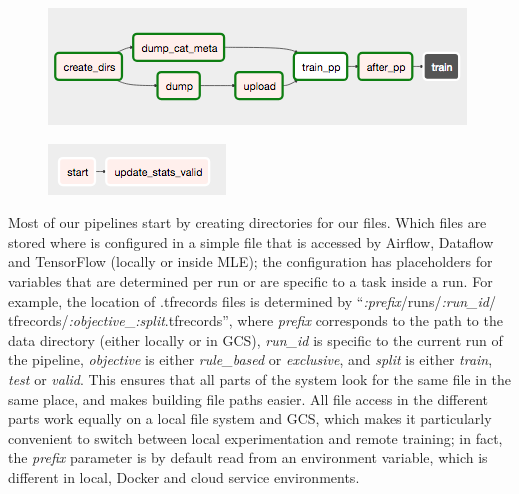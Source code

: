 \begin{figure}
\centering
\begin{minipage}{.48\textwidth}
  \centering
  \includegraphics[width=1.0\linewidth]{figures/af_train_specific}
  \label{fig:af1}
\end{minipage}%
\begin{minipage}{.48\textwidth}
  \centering
  \includegraphics[width=.6\linewidth]{figures/af_train}
  \label{fig:af2}
\end{minipage}
\end{figure}

Most of our pipelines start by creating directories for our files.
Which files are stored where is configured in a simple file that is accessed by Airflow, Dataflow and TensorFlow (locally or inside MLE); the configuration has placeholders for variables that are determined per run or are specific to a task inside a run.
For example, the location of .tfrecords files is determined by ``\textit{:prefix}/runs/\textit{:run\_id}/ tfrecords/\textit{:objective}\_\textit{:split}.tfrecords'', where \textit{prefix} corresponds to the path to the data directory (either locally or in GCS), \textit{run\_id} is specific to the current run of the pipeline, \textit{objective} is either \textit{rule\_based} or \textit{exclusive}, and \textit{split} is either \textit{train}, \textit{test} or \textit{valid}.
This ensures that all parts of the system look for the same file in the same place, and makes building file paths easier.
All file access in the different parts work equally on a local file system and GCS, which makes it particularly convenient to switch between local experimentation and remote training; in fact, the \textit{prefix} parameter is by default read from an environment variable, which is different in local, Docker and cloud service environments.

